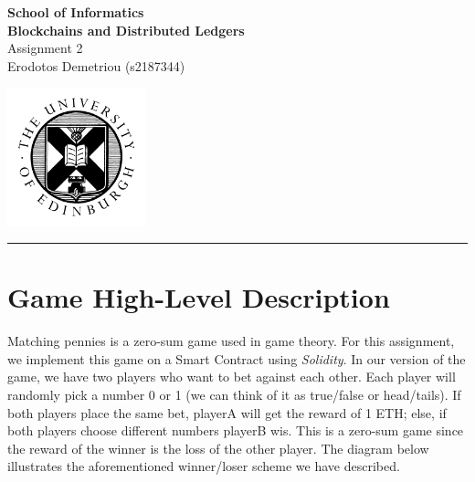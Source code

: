 \documentclass[12pt,a4paper]{article}
\begin{document}
\noindent
\begin{minipage}{120mm}
        {\huge {\bf School of Informatics}}\\
        {\Large {\bf Blockchains and Distributed Ledgers}}\\

        {\Large Assignment 2}\\
        {\normalsize Erodotos Demetriou (s2187344)}
\end{minipage}
\hfill
\begin{minipage}{40mm}              
        \includegraphics[width=40mm]{crest.png}
\end{minipage}

\begin{center}
\rule{\linewidth}{0.5mm}
\end{center}

\section*{Game High-Level Description}
Matching pennies is a zero-sum game used in game theory. For this assignment, we implement this game on a Smart Contract using \emph{Solidity}. In our version of the game, we have two players who want to bet against each other. Each player will randomly pick a number 0 or 1 (we can think of it as true/false or head/tails). If both players place the same bet, playerA will get the reward of 1 ETH; else, if both players choose different numbers playerB wis. This is a zero-sum game since the reward of the winner is the loss of the other player. The diagram below illustrates the aforementioned winner/loser scheme we have described.
\end{document}

